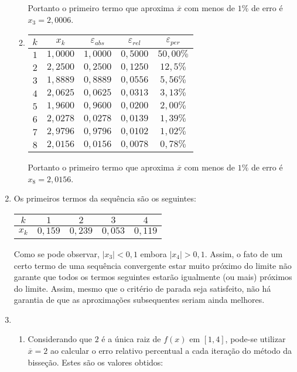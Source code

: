 \documentclass[12pt,a4paper]{article}
\begin{document}
\begin{enumerate}
\begin{enumerate}
Portanto o primeiro termo que aproxima $\overline{x}$ com menos de $1\%$ de erro é $x_3 = 2,0006$.
\item
\begin{tabular}{|c|c|c|c|c|}
\hline
$k$ & $x_k$ & $\varepsilon_{abs}$ & $\varepsilon_{rel}$ & $\varepsilon_{per}$ \\
\hline
$1$ & $1,0000$ & $1,0000$ & $0,5000$ & $50,00\%$ \\
\hline
$2$ & $2,2500$ & $0,2500$ & $0,1250$ & $12,5\%$ \\
\hline
$3$ & $1,8889$ & $0,8889$ & $0,0556$ & $5,56\%$ \\
\hline
$4$ & $2,0625$ & $0,0625$ & $0,0313$ & $3,13\%$ \\
\hline
$5$ & $1,9600$ & $0,9600$ & $0,0200$ & $2,00\%$ \\
\hline
$6$ & $2,0278$ & $0,0278$ & $0,0139$ & $1,39\%$ \\
\hline
$7$ & $2,9796$ & $0,9796$ & $0,0102$ & $1,02\%$ \\
\hline
$8$ & $2,0156$ & $0,0156$ & $0,0078$ & $0,78\%$ \\
\hline
\end{tabular}

Portanto o primeiro termo que aproxima $\overline{x}$ com menos de $1\%$ de erro é $x_8 = 2,0156$.
\end{enumerate}
\item Os primeiros termos da sequência são os seguintes:
\begin{center}
\begin{tabular}{|c|c|c|c|c|}
\hline
$k$   & $1$   & $2$   & $3$   & $4$\\
\hline
$x_k$ & $0,159$ & $0,239$ & $0,053$ & $0,119$ \\
\hline
\end{tabular}
\end{center}
Como se pode observar, $|x_3| < 0,1$ embora $|x_4| > 0,1$. Assim, o fato de um certo termo de uma sequência convergente estar muito próximo do limite não garante que todos os termos seguintes estarão igualmente (ou mais) próximos do limite. Assim, mesmo que o critério de parada seja satisfeito, não há garantia de que as aproximações subsequentes seriam ainda melhores.
\item
\begin{enumerate}
\item Considerando que $2$ é a única raiz de $f(x)$ em $[1, 4]$, pode-se utilizar $\overline{x} = 2$ ao calcular o erro relativo percentual a cada iteração do método da bisseção. Estes são os valores obtidos:


\end{enumerate}
\end{enumerate}
\end{document}
